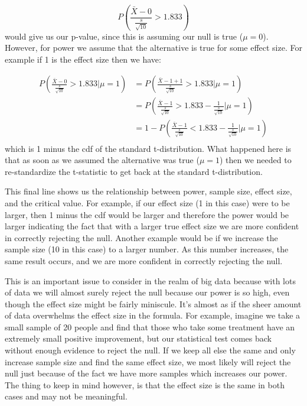 \begin{equation}
P \left( \frac{\bar{X} - 0}{\frac{s}{\sqrt{10}}}> 1.833 \right) 
\end{equation}
\noindent would give us our p-value, since this is assuming our null is true ($\mu=0$). However, for power we assume that the alternative is true for some effect size. For example if 1 is the effect size then we have:

\begin{equation}
\begin{split}
P \left( \frac{\bar{X} - 0}{\frac{s}{\sqrt{10}}} > 1.833 | \mu = 1 \right)  & = P \left(\frac{\bar{X} - 1+1}{\frac{s}{\sqrt{10}}} > 1.833 | \mu = 1 \right) \\
&= P \left( \frac{\bar{X} - 1}{\frac{s}{\sqrt{10}}} > 1.833 - \frac{1}{\frac{s}{\sqrt{10}}}  | \mu = 1 \right) \\
&= 1 - P \left( \frac{\bar{X} - 1}{\frac{s}{\sqrt{10}}}< 1.833 - \frac{1}{\frac{s}{\sqrt{10}}}  | \mu = 1 \right) \\
\end{split}
\end{equation}
\noindent which is 1 minus the cdf of the standard t-distribution. What happened here is that as soon as we assumed the alternative was true ($\mu=1$) then we needed to re-standardize the t-statistic to get back at the standard t-distribution.

This final line shows us the relationship between power, sample size, effect size, and the critical value. For example, if our effect size (1 in this case) were to be larger, then 1 minus the cdf would be larger and therefore the power would be larger indicating the fact that with a larger true effect size we are more confident in correctly rejecting the null. Another example would be if we increase the sample size (10 in this case) to a larger number. As this number increases, the same result occurs, and we are more confident in correctly rejecting the null. 

This is an important issue to consider in the realm of big data because with lots of data we will almost surely reject the null because our power is so high, even though the effect size might be fairly miniscule. It's almost as if the sheer amount of data overwhelms the effect size in the formula. For example, imagine we take a small sample of 20 people and find that those who take some treatment have an extremely small positive improvement, but our statistical test comes back without enough evidence to reject the null. If we keep all else the same and only increase sample size and find the same effect size, we most likely will reject the null just because of the fact we have more samples which increases our power. The thing to keep in mind however, is that the effect size is the same in both cases and may not be meaningful. 







